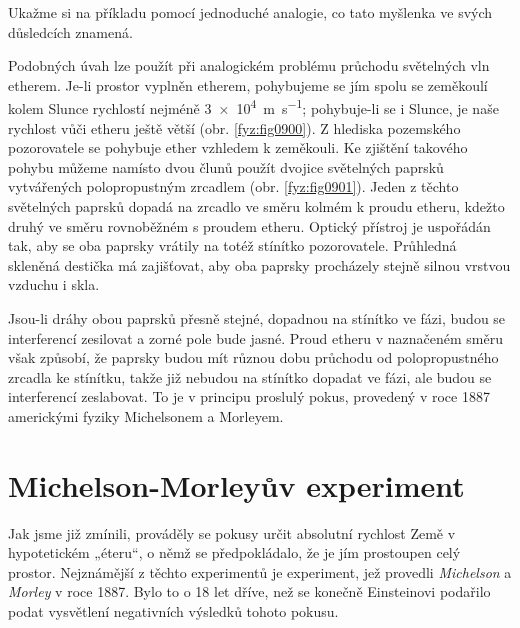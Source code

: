     Ukažme si na příkladu pomocí jednoduché analogie, co tato myšlenka ve svých důsledcích znamená.
    

    Podobných úvah lze použít při analogickém problému průchodu světelných vln etherem. Je-li
    prostor vyplněn etherem, pohybujeme se jím spolu se zeměkoulí kolem Slunce rychlostí nejméně
    \SI{3e4}{\metre\per\second}; pohybuje-li se i Slunce, je naše rychlost vůči etheru ještě větší
    (obr. \ref{fyz:fig0900}). Z hlediska pozemského pozorovatele se pohybuje ether vzhledem k
    zeměkouli. Ke zjištění takového pohybu můžeme namísto dvou člunů použít dvojice světelných
    paprsků vytvářených polopropustným zrcadlem (obr. \ref{fyz:fig0901}). Jeden z těchto světelných
    paprsků dopadá na zrcadlo ve směru kolmém k proudu etheru, kdežto druhý ve směru rovnoběžném s
    proudem etheru. Optický přístroj je uspořádán tak, aby se oba paprsky vrátily na totéž stínítko
    pozorovatele. Průhledná skleněná destička má zajišťovat, aby oba paprsky procházely stejně
    silnou vrstvou vzduchu i skla.


    Jsou-li dráhy obou paprsků přesně stejné, dopadnou na stínítko ve fázi, budou se interferencí
    zesilovat a zorné pole bude jasné. Proud etheru v naznačeném směru však způsobí, že paprsky
    budou mít různou dobu průchodu od polopropustného zrcadla ke stínítku, takže již nebudou na
    stínítko dopadat ve fázi, ale budou se interferencí zeslabovat. To je v principu proslulý pokus,
    provedený v roce 1887 americkými fyziky Michelsonem a Morleyem.

  
  \section{Michelson-Morleyův experiment}\label{fyz:IchapXVsecV}
    Jak jsme již zmínili, prováděly se pokusy určit absolutní rychlost Země v hypotetickém „éteru“, 
    o němž se předpokládalo, že je jím prostoupen celý prostor. Nejznámější z těchto experimentů je 
    experiment, jež provedli \emph{Michelson} a \emph{Morley} v roce \num{1887}. Bylo to o \num{18} 
    let dříve, než se konečně Einsteinovi podařilo podat vysvětlení negativních výsledků tohoto 
    pokusu.

